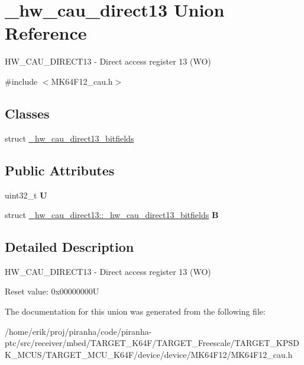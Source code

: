 \hypertarget{union__hw__cau__direct13}{}\section{\+\_\+hw\+\_\+cau\+\_\+direct13 Union Reference}
\label{union__hw__cau__direct13}


H\+W\+\_\+\+C\+A\+U\+\_\+\+D\+I\+R\+E\+C\+T13 -\/ Direct access register 13 (WO)  




{\ttfamily \#include $<$M\+K64\+F12\+\_\+cau.\+h$>$}

\subsection*{Classes}
\begin{DoxyCompactItemize}
\item 
struct \hyperlink{struct__hw__cau__direct13_1_1__hw__cau__direct13__bitfields}{\+\_\+hw\+\_\+cau\+\_\+direct13\+\_\+bitfields}
\end{DoxyCompactItemize}
\subsection*{Public Attributes}
\begin{DoxyCompactItemize}
\item 
uint32\+\_\+t {\bfseries U}\hypertarget{union__hw__cau__direct13_a77c8b31fb921a2366914646cd04f5ad8}{}\label{union__hw__cau__direct13_a77c8b31fb921a2366914646cd04f5ad8}

\item 
struct \hyperlink{struct__hw__cau__direct13_1_1__hw__cau__direct13__bitfields}{\+\_\+hw\+\_\+cau\+\_\+direct13\+::\+\_\+hw\+\_\+cau\+\_\+direct13\+\_\+bitfields} {\bfseries B}\hypertarget{union__hw__cau__direct13_a42dc6fb40039f0fc02e3a11c7b5db5a1}{}\label{union__hw__cau__direct13_a42dc6fb40039f0fc02e3a11c7b5db5a1}

\end{DoxyCompactItemize}


\subsection{Detailed Description}
H\+W\+\_\+\+C\+A\+U\+\_\+\+D\+I\+R\+E\+C\+T13 -\/ Direct access register 13 (WO) 

Reset value\+: 0x00000000U 

The documentation for this union was generated from the following file\+:\begin{DoxyCompactItemize}
\item 
/home/erik/proj/piranha/code/piranha-\/ptc/src/receiver/mbed/\+T\+A\+R\+G\+E\+T\+\_\+\+K64\+F/\+T\+A\+R\+G\+E\+T\+\_\+\+Freescale/\+T\+A\+R\+G\+E\+T\+\_\+\+K\+P\+S\+D\+K\+\_\+\+M\+C\+U\+S/\+T\+A\+R\+G\+E\+T\+\_\+\+M\+C\+U\+\_\+\+K64\+F/device/device/\+M\+K64\+F12/M\+K64\+F12\+\_\+cau.\+h\end{DoxyCompactItemize}
